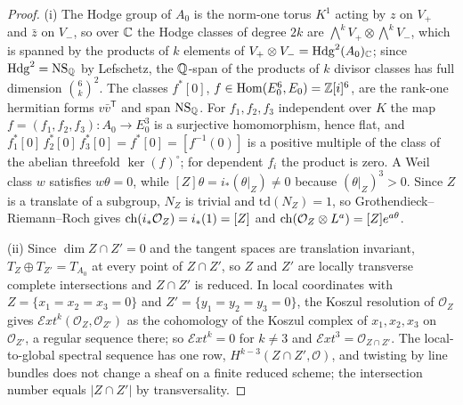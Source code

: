 \begin{proof}
(i) The Hodge group of $A_{0}$ is the norm-one torus $K^{1}$ acting by $z$ on $V_{+}$ and $\bar z$ on $V_{-}$, so over $\mathbb{C}$ the Hodge classes of degree $2k$ are $\bigwedge^{k}V_{+}\otimes\bigwedge^{k}V_{-}$, which is spanned by the products of $k$ elements of $V_{+}\otimes V_{-}=\mathrm{Hdg}^{2}(A_{0})_{\mathbb{C}}$; since $\mathrm{Hdg}^{2}=\mathrm{NS}_{\mathbb{Q}}$ by Lefschetz, the $\mathbb{Q}$-span of the products of $k$ divisor classes has full dimension $\binom{6}{k}^{2}$. The classes $f^{*}[0]$, $f\in\mathrm{Hom}(E_{0}^{6},E_{0})=\mathbb{Z}[i]^{6}$, are the rank-one hermitian forms $v\bar v^{\mathsf{T}}$ and span $\mathrm{NS}_{\mathbb{Q}}$. For $f_{1},f_{2},f_{3}$ independent over $K$ the map $f=(f_{1},f_{2},f_{3})\colon A_{0}\to E_{0}^{3}$ is a surjective homomorphism, hence flat, and $f_{1}^{*}[0]\,f_{2}^{*}[0]\,f_{3}^{*}[0]=f^{*}[0]=[f^{-1}(0)]$ is a positive multiple of the class of the abelian threefold $\ker(f)^{\circ}$; for dependent $f_{i}$ the product is zero. A Weil class $w$ satisfies $w\theta=0$, while $[Z]\theta=i_{*}(\theta|_{Z})\ne0$ because $(\theta|_{Z})^{3}>0$. Since $Z$ is a translate of a subgroup, $N_{Z}$ is trivial and $\mathrm{td}(N_{Z})=1$, so Grothendieck--Riemann--Roch gives $\mathrm{ch}(i_{*}\mathcal{O}_{Z})=i_{*}(1)=[Z]$ and $\mathrm{ch}(\mathcal{O}_{Z}\otimes L^{a})=[Z]e^{a\theta}$.

(ii) Since $\dim Z\cap Z'=0$ and the tangent spaces are translation invariant, $T_{Z}\oplus T_{Z'}=T_{A_{0}}$ at every point of $Z\cap Z'$, so $Z$ and $Z'$ are locally transverse complete intersections and $Z\cap Z'$ is reduced. In local coordinates with $Z=\{x_{1}=x_{2}=x_{3}=0\}$ and $Z'=\{y_{1}=y_{2}=y_{3}=0\}$, the Koszul resolution of $\mathcal{O}_{Z}$ gives $\mathcal{E}xt^{k}(\mathcal{O}_{Z},\mathcal{O}_{Z'})$ as the cohomology of the Koszul complex of $x_{1},x_{2},x_{3}$ on $\mathcal{O}_{Z'}$, a regular sequence there; so $\mathcal{E}xt^{k}=0$ for $k\ne3$ and $\mathcal{E}xt^{3}=\mathcal{O}_{Z\cap Z'}$. The local-to-global spectral sequence has one row, $H^{k-3}(Z\cap Z',\mathcal{O})$, and twisting by line bundles does not change a sheaf on a finite reduced scheme; the intersection number equals $|Z\cap Z'|$ by transversality.


\end{proof}
